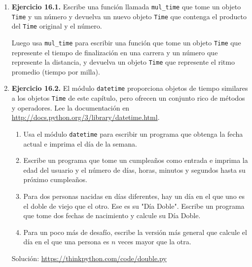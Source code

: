\begin{enumerate}
\item \textbf{Ejercicio 16.1.} Escribe una función llamada \texttt{mul\_time} que tome un objeto \texttt{Time} y un número y devuelva un nuevo objeto \texttt{Time} que contenga el producto del \texttt{Time} original y el número.

Luego usa \texttt{mul\_time} para escribir una función que tome un objeto \texttt{Time} que represente el tiempo de finalización en una carrera y un número que represente la distancia, y devuelva un objeto \texttt{Time} que represente el ritmo promedio (tiempo por milla).

\item \textbf{Ejercicio 16.2.} El módulo \texttt{datetime} proporciona objetos de tiempo similares a los objetos \texttt{Time} de este capítulo, pero ofrecen un conjunto rico de métodos y operadores. Lee la documentación en \url{http://docs.python.org/3/library/datetime.html}.

\begin{enumerate}
\item Usa el módulo \texttt{datetime} para escribir un programa que obtenga la fecha actual e imprima el día de la semana.
\item Escribe un programa que tome un cumpleaños como entrada e imprima la edad del usuario y el número de días, horas, minutos y segundos hasta su próximo cumpleaños.
\item Para dos personas nacidas en días diferentes, hay un día en el que uno es el doble de viejo que el otro. Ese es su "Día Doble". Escribe un programa que tome dos fechas de nacimiento y calcule su Día Doble.
\item Para un poco más de desafío, escribe la versión más general que calcule el día en el que una persona es $n$ veces mayor que la otra.
\end{enumerate}

Solución: \url{https://thinkpython.com/code/double.py}
\end{enumerate}
